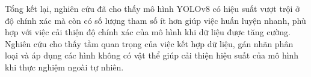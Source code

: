 \documentclass[../the.tex]{subfiles}
\begin{document}
\bigskip
{\fontsize{13}{12} \selectfont

    Tổng kết lại, nghiên cứu đã cho thấy mô hình YOLOv8 có hiệu suất vượt trội ở độ chính xác
    mà còn có số lượng tham số ít hơn giúp việc huấn luyện nhanh, phù hợp với việc cải thiện độ chính xác của mô hình khi dữ liệu được tăng cường.
    Nghiên cứu cho thấy tầm quan trọng của việc kết hợp dữ liệu, gán nhãn phân loại và áp dụng các hình không có vật thể giúp cải thiện hiệu suất của mô hình khi thực nghiệm ngoài tự nhiên.

}
\end{document}
